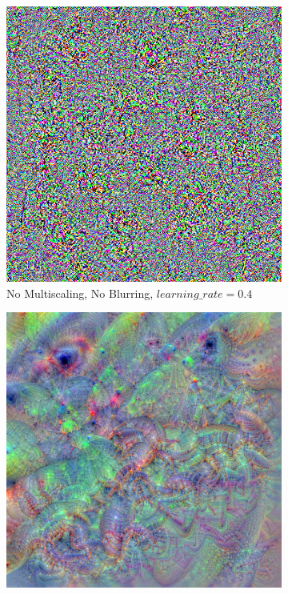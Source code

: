 \newpage
\begin{figure}
    \captionsetup{justification=centering}

    \begin{subfigure}[t]{0.31\textwidth}
        \captionsetup{justification=centering}
        \centering
        \includegraphics[width=.7\linewidth]{figuras/feat_vis/experiments/layers/final/l13/random_image_pl1_lr4e-1_layer28_no-blur.png}
        \caption{No Multiscaling, No Blurring, \(learning\_rate = 0.4\)}
    \end{subfigure}
    \hfill
    \begin{subfigure}[t]{0.31\textwidth}
        \captionsetup{justification=centering}
        \centering
        \includegraphics[width=.7\linewidth]{figuras/feat_vis/experiments/layers/final/l13/random_image_pl6_lr8e-2_layer28_blur-0.4.png}

\end{subfigure}
\end{figure}
